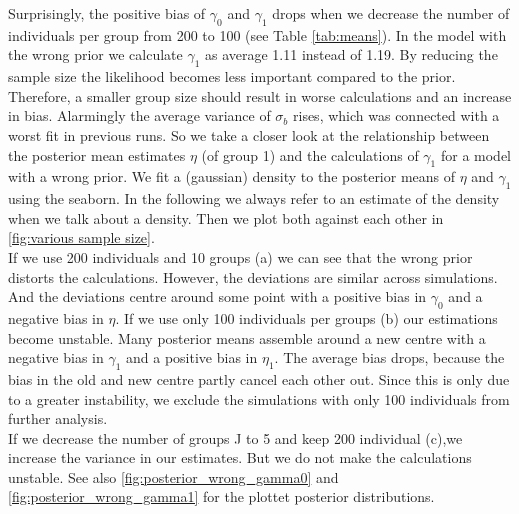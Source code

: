 Surprisingly, the positive bias of $\gamma_0$ and $\gamma_1$ drops when we decrease the number of individuals per group from 200 to 100 (see Table \ref{tab:means}). In the model with the wrong prior we calculate $\gamma_1$  as average 1.11 instead of 1.19. 
By reducing the sample size the likelihood becomes less important compared to the prior. Therefore, a smaller group size should result in worse calculations and an increase in bias. Alarmingly the average variance of $\sigma_b$ rises, which was connected with a worst fit in previous runs. So we take a closer look at the relationship between the posterior mean estimates $\eta$ (of group 1) and the calculations of $\gamma_1$ for a model with a wrong prior. 
We fit a (gaussian) density to the posterior means of $\eta$ and $\gamma_1$ using the seaborn. In the following we always refer to an estimate of the density when we talk about a density.
Then we plot both against each other in \ref{fig:various sample size}. \\
If we use 200 individuals and 10 groups (a) we can see that the wrong prior distorts the calculations. However, the deviations are similar across simulations. And the deviations centre around some point with a positive bias in $\gamma_0$ and a negative bias in $\eta$.
If we use only 100 individuals per groups (b) our estimations become unstable. Many posterior means assemble around a new centre with a negative bias in $\gamma_1$ and a positive bias in $\eta_1$. The average bias drops, because the bias in the old and new centre partly cancel each other out. Since this is only due to a greater instability, we exclude the simulations with only 100 individuals from further analysis.\\
If we decrease the number of groups J to 5 and keep 200 individual (c),we increase the variance in our estimates.  But we do not make the calculations unstable.
See also \ref{fig:posterior_wrong_gamma0} and \ref{fig:posterior_wrong_gamma1} for the plottet posterior distributions. 

